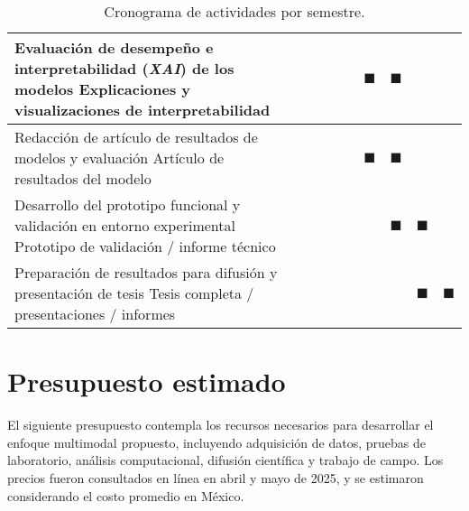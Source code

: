 \begin{landscape}
\begin{table}[h]
\begin{tabular}{|p{10cm}|c|c|c|c|c|c|c|c|}
\hline
Evaluación de desempeño e interpretabilidad (\textit{XAI}) de los modelos \newline [OE4, OE5] Explicaciones y visualizaciones de interpretabilidad &  &  &  &  & $\blacksquare$ & $\blacksquare$ &  &  \\
\hline
Redacción de artículo de resultados de modelos y evaluación \newline [OE3, OE4, OE5] Artículo de resultados del modelo &  &  &  &  & $\blacksquare$ & $\blacksquare$ &  &  \\
\hline
Desarrollo del prototipo funcional y validación en entorno experimental \newline  [OE6] Prototipo de validación / informe técnico &  &  &  &  &  & $\blacksquare$ & $\blacksquare$ &  \\
\hline
Preparación de resultados para difusión y presentación de tesis \newline  [OE6] Tesis completa / presentaciones / informes &  &  &  &  &  &  & $\blacksquare$ & $\blacksquare$ \\
\hline
\end{tabular}
\caption{Cronograma de actividades por semestre.}
\label{tab:cronograma}
\end{table}
\end{landscape}


\section{Presupuesto estimado}

El siguiente presupuesto contempla los recursos necesarios para desarrollar el enfoque multimodal propuesto, incluyendo adquisición de datos, pruebas de laboratorio, análisis computacional, difusión científica y trabajo de campo. Los precios fueron consultados en línea en abril y mayo de 2025, y se estimaron considerando el costo promedio en México.\\

